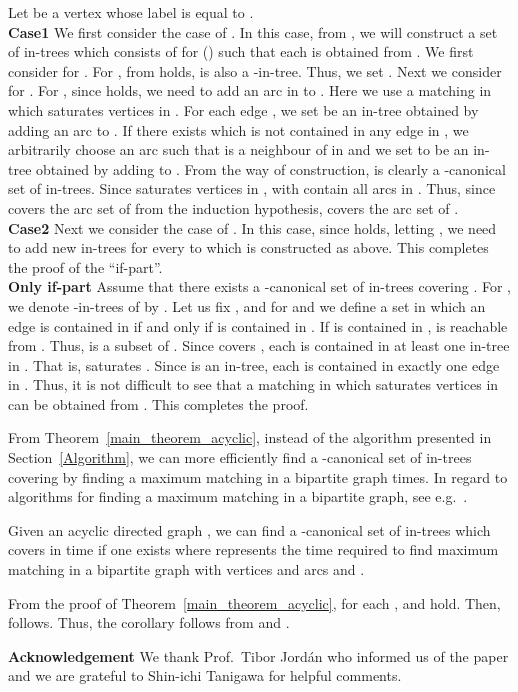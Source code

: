 \documentclass[11pt]{article}
\newcounter{ichi}
\newcounter{ni}
\theoremstyle{plain}
\newcommand{\eop}{\hfill \usebox{\ProofSym}}
\newenvironment{proof}{\noindent {\it Proof.}}{\eop\par\vspace{0.3cm}}
\begin{document}
\begin{proof}
Let  be a vertex whose label is equal to .\\ 
{\bf Case1}
We first consider the case of . 
In this case, from , 
we will construct a set  of in-trees which consists of  
for  () such that each  
is obtained from . We first consider  for . 
For , 
from  holds, 
 is also a -in-tree. Thus, we set . 
Next we consider  for . 
For , since  holds,
we need to add an arc in  to . 
Here we use a matching  in  which saturates vertices in . 
For each edge , we set  be an in-tree obtained by adding 
an arc  to . If there exists   
which is not contained in any edge in , 
we arbitrarily choose an arc  such that  is a neighbour of  in 
and we set  to be 
an in-tree obtained by adding  to . 
From the way of construction,  is clearly a -canonical set of in-trees.
Since  saturates vertices in ,  with  contain all arcs in 
. Thus, since  covers the arc set of  from the induction hypothesis, 
 covers the arc set of . \\
{\bf Case2}
Next we consider the case of . In this case, since  holds, 
letting , 
we need to add new in-trees  for every  
to  which is constructed as above. 
This completes the proof of the ``if-part''.\\
{\bf Only if-part}
Assume that there exists a -canonical set  of in-trees covering
. For , we denote  -in-trees
of  by .
Let us fix , and for  and  we define a set  in which
an edge  is contained in  if and only if  is contained in . If  is contained in , 
is reachable from . Thus, 
 is a subset of . 
Since  covers ,
each  is contained in at least one in-tree in
. That is,  saturates . 
Since  is an in-tree, 
each  is contained in exactly one edge in . 
Thus, it is not difficult to see
that a matching in  which saturates vertices in  can be
obtained from . This completes the proof.  
\end{proof}
From Theorem~\ref{main_theorem_acyclic}, 
instead of the algorithm presented in Section~\ref{Algorithm}, 
we can more efficiently find a -canonical set
of in-trees covering  by finding a maximum matching in
a bipartite graph  times.  
In regard to algorithms for finding a maximum matching in a bipartite
graph, see e.g.~\cite{HK73}. 

\begin{corollary} 
Given an acyclic directed graph  , 
we can find a -canonical set of in-trees which covers 
in  time if one exists 
where  represents the time 
required to find maximum matching in a bipartite graph with  vertices and 
 arcs and . 
\end{corollary}
\begin{proof}
From the proof of Theorem~\ref{main_theorem_acyclic}, for each ,  and  hold. Then,
  follows. 
Thus, the corollary follows from 
 and . 
\end{proof}
{\bf Acknowledgement}
We thank Prof.~Tibor Jord\'{a}n who informed us of the paper \cite{F06} and 
we are grateful to Shin-ichi Tanigawa for helpful comments. 
\end{document}
